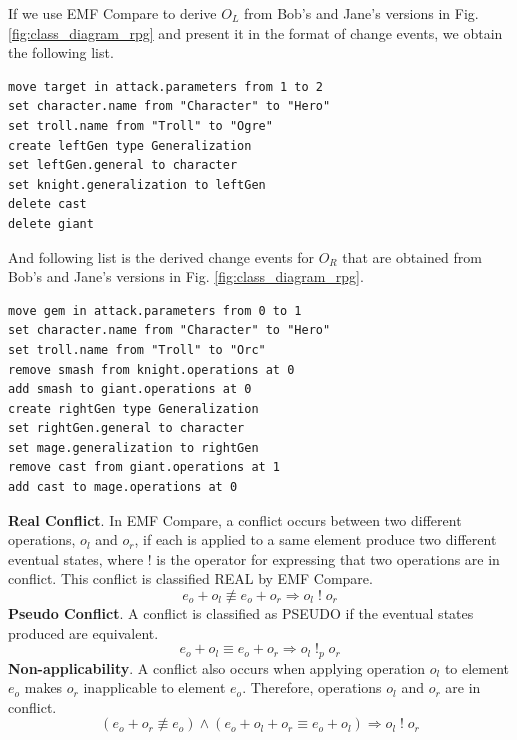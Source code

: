 If we use EMF Compare to derive $O_{L}$ from Bob's and Jane's versions in Fig. \ref{fig:class_diagram_rpg} and present it in the format of change events, we obtain the following list. 
\begin{lstlisting}[firstnumber=1,style=eol,caption={The derived change events (operations) made by Bob to produce the right model in Fig. \ref{fig:class_diagram_left} (right version).},label=lst:cbp_left_state]
move target in attack.parameters from 1 to 2
set character.name from "Character" to "Hero"
set troll.name from "Troll" to "Ogre"
create leftGen type Generalization
set leftGen.general to character
set knight.generalization to leftGen
delete cast
delete giant
\end{lstlisting}

And following list is the derived change events for $O_{R}$ that are obtained from Bob's and Jane's versions in Fig. \ref{fig:class_diagram_rpg}. 
\begin{lstlisting}[firstnumber=1,style=eol,caption={The derived change events (operations) made by Alice to produce the right model in Fig. \ref{fig:class_diagram_right} (right version).},label=lst:cbp_right_state]
move gem in attack.parameters from 0 to 1
set character.name from "Character" to "Hero"
set troll.name from "Troll" to "Orc"
remove smash from knight.operations at 0
add smash to giant.operations at 0
create rightGen type Generalization
set rightGen.general to character
set mage.generalization to rightGen
remove cast from giant.operations at 1
add cast to mage.operations at 0
\end{lstlisting}

\textbf{Real Conflict}. In EMF Compare, a conflict occurs between two different operations, $o_{l}$ and $o_{r}$, if each is applied to a same element produce two different eventual states, where $!$ is the operator for expressing that two operations are in conflict. This conflict is classified \textsf{REAL} by EMF Compare.
\begin{equation} \label{eq:conflict_1.8}
e_{o} + o_{l} \not\equiv e_{o} + o_{r} \Rightarrow o_{l}\;!\;o_{r}
\end{equation} 
\textbf{Pseudo Conflict}. A conflict is classified as \textsf{PSEUDO} if the eventual states produced are equivalent. 
\begin{equation} \label{eq:conflict_1.9}
e_{o} + o_{l} \equiv e_{o} + o_{r} \Rightarrow o_{l}\;!_{p}\;o_{r}
\end{equation} 
\textbf{Non-applicability}. A conflict also occurs when applying operation $o_{l}$ to element $e_{o}$ makes $o_{r}$ inapplicable to element $e_{o}$. Therefore, operations $o_{l}$ and $o_{r}$ are in conflict. 
\begin{equation} \label{eq:conflict_1.10}
(e_{o} + o_{r} \not\equiv e_{o}) \wedge (e_{o} + o_{l} + o_{r} \equiv e_{o} + o_{l}) \Rightarrow o_{l}\;!\;o_{r}
\end{equation}

